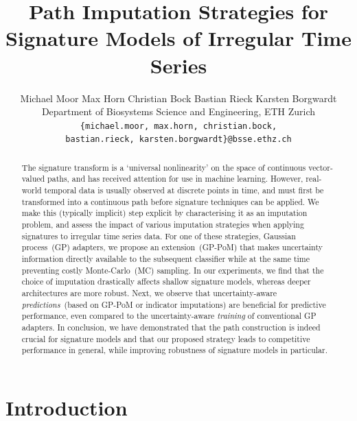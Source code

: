\documentclass{article}
\title{Path Imputation Strategies for Signature Models of Irregular Time Series}
\author{
    Michael Moor
    \And
	Max Horn
	\And
	Christian Bock
	\And
	Bastian Rieck
	\And
	Karsten Borgwardt
	\AND \\[-12pt]
	Department of Biosystems Science and Engineering, ETH Zurich
	\\
	\hspace{-6.5em}\texttt{\{michael.moor, max.horn, christian.bock,}
	\\
	\hspace{6.5em}\texttt{bastian.rieck, karsten.borgwardt\}@\hspace{0.1pt}bsse.ethz.ch}
} %
\begin{document}
\maketitle

\begin{abstract}
The signature transform is a `universal nonlinearity' on the space of
continuous vector-valued paths, and has received attention for use in
machine learning. However, real-world temporal data is usually observed at discrete points in time, and must first be transformed into a continuous path before
signature techniques can be applied. We make this (typically implicit) step explicit by characterising it as an imputation
problem, and assess the impact of various imputation strategies when
applying signatures to irregular time series data. For one of these
strategies, Gaussian process~(GP) adapters, we propose an
extension~(GP-PoM) that makes uncertainty information directly available
to the subsequent classifier while at the same time preventing costly
Monte-Carlo~(MC) sampling. In our experiments, we find that the choice
of imputation  drastically affects shallow signature models, whereas
deeper architectures are more robust. Next, we observe that
uncertainty-aware \emph{predictions}~(based on GP-PoM or indicator
imputations) are beneficial for predictive performance, even compared to
the uncertainty-aware \emph{training} of conventional GP adapters.
%
In conclusion, we have demonstrated that the path construction is indeed
crucial for signature models and that our proposed strategy leads to
competitive performance in general, while improving robustness of
signature models in particular.
\end{abstract} %

\section{Introduction}
\end{document}
